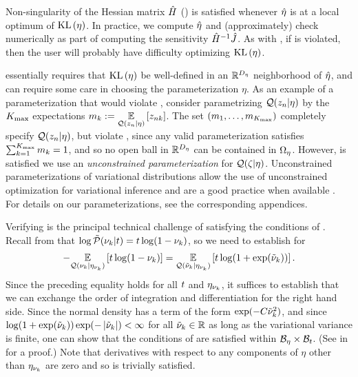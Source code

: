Non-singularity of the Hessian matrix $\hat{H}$
() is satisfied whenever $\hat\eta$ is at a local
optimum of $\mathrm{KL}\left(\eta\right)$.  In practice, we compute $\hat\eta$ and (approximately)
check  numerically as part of computing the
sensitivity $\hat{H}^{-1} \hat J$.  As with
, if  is
violated, then the user will probably have difficulty optimizing $\mathrm{KL}\left(\eta\right)$.

 essentially requires that $\mathrm{KL}\left(\eta\right)$
be well-defined in an $\mathbb{R}^{D_{\eta}}$ neighborhood of $\hat\eta$, and can
require some care in choosing the parameterization $\eta$.  As an example of a
parameterization that would violate ,
consider parametrizing $\mathcal{Q}(z_{n} \vert \eta)$ by the ${K_{\mathrm{max}}}$ expectations
$m_k := \underset{\mathcal{Q}(z_{n} \vert \eta)}{\mathbb{E}}\left[z_{nk}\right]$.  The set $(m_1, \ldots,
m_{K_{\mathrm{max}}})$ completely specify $\mathcal{Q}(z_{n} \vert \eta)$, but violate
, since any valid parameterization
satisfies $\sum_{k=1}^{K_{\mathrm{max}}} m_k = 1$, and so no open ball in
$\mathbb{R}^{D_{\eta}}$ can be contained in $\Omega_{\eta}$.  However,
 is satisfied we use an {\em
unconstrained parameterization} for $\mathcal{Q}(\zeta \vert \eta)$.   Unconstrained
parameterizations of variational distributions allow the use of unconstrained
optimization for variational inference and are a good practice when available
\citep{kucukelbir:2016:advi}.  For details on our parameterizations, see
the corresponding appendices.

Verifying  is the principal technical challenge of
satisfying the conditions of . Recall from
 that $\log \tilde{\mathcal{P}}(\nu_{k} \vert t) = t \log (1 - \nu_{k})$,
so we need to establish  for
%
\begin{align*}
%
-\expect{\q(\nuk \vert \etanuk)}{t \log (1 - \nuk)} =
\expect{\q(\lnuk \vert \etanuk)}
      {t \log (1 + \exp(\lnuk))}.
%
\end{align*}
%
Since the preceding equality holds for all $t$ and $\eta_{\nu_{k}}$, it suffices to
establish that we can exchange the order of integration and differentiation for
the right hand side.  Since the normal density has a term of the form
$\exp(-C \tilde{\nu}_{k}^2)$, and since $\log (1 + \exp(\tilde{\nu}_{k})) \exp(-\left|\tilde{\nu}_{k}\right|)  <
\infty$ for all $\tilde{\nu}_{k} \in \mathbb{R}$ as long as the variational variance is
finite, one can show that the conditions of  are
satisfied within $\mathcal{B}_\eta \times \mathcal{B}_t$.  (See
 in  for a proof.)
Note that
derivatives with respect to any components of $\eta$ other than $\eta_{\nu_{k}}$ are
zero and so  is trivially satisfied.


